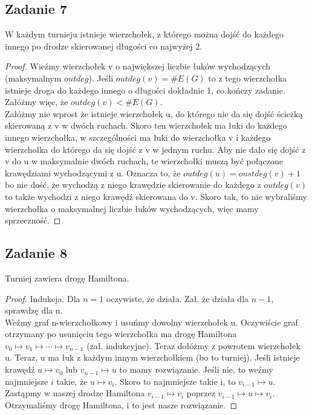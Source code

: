 \documentclass[a4paper]{article}
\begin{document}
\subsection*{Zadanie 7}
W każdym turnieju istnieje wierzchołek, z którego można dojść do każdego innego po drodze skierowanej długości co najwyżej 2.
\begin{proof}
Wieźmy wierzchołek v o największej liczbie łuków wychodzących (maksymalnym $outdeg$). Jeśli $outdeg(v)=\# E(G)$ to z tego wierzchołka istnieje droga do każdego innego o długości dokładnie 1, co kończy zadanie. Załóżmy więc, że $outdeg(v)<\# E(G)$.\\
Załóżmy nie wprost że istnieje wierzchołek u, do którego nie da się dojść ścieżką skierowaną z v w dwóch ruchach. Skoro ten wierzchołek ma łuki do każdego innego wierzchołka, w szczególności ma łuki do wierzchołka v i każdego wierzchołka do którego da się dojść z v w jednym ruchu. Aby nie dało się dojść z v do u w maksymalnie dwóch ruchach, te wierzchołki muszą być połączone krawędziami wychodzącymi z u. Oznacza to, że $outdeg(u)=oustdeg(v)+1$ bo nie dość, że wychodzą z niego krawędzie skierowanie do każdego z $outdeg(v)$ to także wychodzi z niego krawędź skierowana do v. Skoro tak, to nie wybraliśmy wierzchołka o maksymalnej liczbie łuków wychodzących, więc mamy sprzeczność.
\end{proof}

\subsection*{Zadanie 8}
Turniej zawiera drogę Hamiltona.
\begin{proof}
Indukcja. Dla $n=1$ oczywiste, że działa. Zał, że działa dla $n-1$, sprawdzę dla n.\\
Weźmy graf n-wierzchołkowy i usuńmy dowolny wierzchołek u. Oczywiście graf otrzymany po usunięciu tego wierzchołka ma drogę Hamiltona $v_0 \mapsto v_1 \mapsto \cdots \mapsto v_{n-1}$ (zał. indukcyjne). Teraz dołóżmy z powrotem wierzchołek u. Teraz, u ma łuk z każdym innym wierzchołkiem (bo to turniej). Jeśli istnieje krawędź $u \mapsto v_0$ lub $v_{n-1} \mapsto u$ to mamy rozwiązanie. Jeśli nie, to weźmy najmniejsze $i$ takie, że $u \mapsto v_i$. Skoro to najmniejsze takie i, to $v_{i-1} \mapsto u$. Zastąpmy w naszej drodze Hamiltona $v_{i-1}\mapsto v_{i}$ poprzez $v_{i-1}\mapsto u \mapsto v_{i}$. Otrzymaliśmy drogę Hamiltona, i to jest nasze rozwiązanie.
\end{proof}
\end{document}
